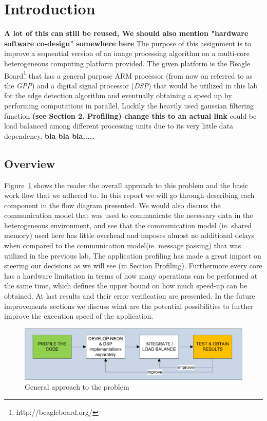 \section{Introduction}
\textbf{A lot of this can still be reused,  We should also mention "hardware software co-design" somewhere here}
The purpose of this assignment is to improve a sequential version of an image processing algorithm on a multi-core heterogeneous computing platform provided. The given platform is the Beagle Board\footnote{http://beagleboard.org/} that has a general purpose ARM processor (from now on referred to as the \emph{GPP}) and a digital signal processor (\emph{DSP}) that would be utilized in this lab for the edge detection algorithm and eventually obtaining a speed up by performing computations in parallel. Luckily the heavily used gaussian filtering function \textbf{(see Section 2. Profiling) change this to an actual link} could be load balanced among different processing units due to its very little data dependency. \textbf{bla bla bla..... }

\subsection{Overview}
Figure~\ref{fig:workflow} shows the reader the overall approach to this problem and the basic work flow that we adhered to. In this report we will go through describing each component in the flow diagram presented. We would also discuss the communication model that was used to communicate the necessary data in the heterogeneous environment, and see that the communication model (ie. shared memory) used here has little overhead and imposes almost no additional delays when compared to the communication model(ie. message passing) that was utilized in the previous lab. The application profiling has made a great impact on steering our decisions as we will see (in Section Profiling). Furthermore every core has a hardware limitation in terms of how many operations can be performed at the same time, which defines the upper bound on how much speed-up can be obtained. At last results and their error verification are presented. In the future improvements sections we discuss what are the potential possibilities to further improve the execution speed of the application.

\begin{figure}
\includegraphics[width=\linewidth]{drawings/workflow}
\caption{General approach to the problem}
\label{fig:workflow}
\end{figure}


